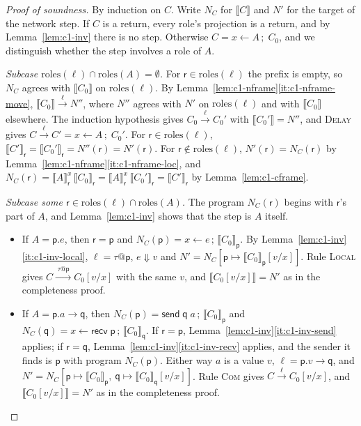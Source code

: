 \documentclass[11pt]{report}
\makeatletter
\theoremstyle{plain}
\theoremstyle{definition}
\theoremstyle{remark}
\newcommand{\kw}[1]{\mathsf{#1}}
\newcommand{\pp}{\mathsf{p}}
\newcommand{\qq}{\mathsf{q}}
\newcommand{\rr}{\mathsf{r}}
\newcommand{\bind}[3]{#1 \leftarrow #2\,;\;#3}
\newcommand{\com}[3]{#1.#2 \to #3}
\newcommand{\roles}[1]{\mathrm{roles}(#1)}
\newcommand{\tauat}[1]{\tau\mathord{@}#1}
\newcommand{\lto}[1]{\xrightarrow{\;#1\;}}
\newcommand{\nsend}[2]{\kw{send}\;#1\;#2}
\newcommand{\nrecv}[1]{\kw{recv}\;#1}
\newcommand{\upd}[3]{#1[#2 \mapsto #3]}
\newcommand{\proj}[2]{\llbracket #1 \rrbracket_{#2}}
\newcommand{\projn}[1]{\llbracket #1 \rrbracket}
\newcommand{\pre}[3]{\llbracket #1 \rrbracket^{#2}_{#3}}
\newcommand{\rn}[1]{{\normalfont\scshape #1}}
\newcommand{\subcase}[1]{\smallskip\noindent\textit{Subcase #1.}\;}
\makeatother
\begin{document}
\begin{proof}[Proof of soundness]
  By induction on $C$.  Write $N_C$ for $\projn{C}$ and $N'$ for the target
  of the network step.  If $C$ is a return, every role's projection is a
  return, and by Lemma~\ref{lem:c1-inv} there is no step.  Otherwise
  $C=\bind{x}{A}{C_0}$, and we distinguish whether the step involves a role
  of $A$.

  \subcase{$\roles{\ell}\cap\roles{A}=\emptyset$}
  For $\rr\in\roles{\ell}$ the prefix is empty, so $N_C$ agrees with
  $\projn{C_0}$ on $\roles{\ell}$.  By
  Lemma~\ref{lem:c1-nframe}\ref{it:c1-nframe-move},
  $\projn{C_0}\lto{\ell}N''$, where $N''$ agrees with $N'$ on $\roles{\ell}$ and
  with $\projn{C_0}$ elsewhere.  The induction hypothesis gives
  $C_0\lto{\ell}C_0'$ with $\projn{C_0'}=N''$, and \rn{Delay} gives
  $C\lto{\ell}C'=\bind{x}{A}{C_0'}$.  For $\rr\in\roles{\ell}$,
  $\proj{C'}{\rr}=\proj{C_0'}{\rr}=N''(\rr)=N'(\rr)$.  For
  $\rr\notin\roles{\ell}$, $N'(\rr)=N_C(\rr)$ by
  Lemma~\ref{lem:c1-nframe}\ref{it:c1-nframe-loc}, and
  $N_C(\rr)=\pre{A}{x}{\rr}\,\proj{C_0}{\rr}=\pre{A}{x}{\rr}\,\proj{C_0'}{\rr}=\proj{C'}{\rr}$
  by Lemma~\ref{lem:c1-cframe}.

  \subcase{some $\rr\in\roles{\ell}\cap\roles{A}$}
  The program $N_C(\rr)$ begins with $\rr$'s part of $A$, and
  Lemma~\ref{lem:c1-inv} shows that the step is $A$ itself.
  \begin{itemize}
  \item If $A=\pp.e$, then $\rr=\pp$ and $N_C(\pp)=x\leftarrow e\,;\,\proj{C_0}{\pp}$.
    By Lemma~\ref{lem:c1-inv}\ref{it:c1-inv-local}, $\ell=\tauat{\pp}$,
    $e\Downarrow v$ and $N'=\upd{N_C}{\pp}{\proj{C_0}{\pp}[v/x]}$.  Rule
    \rn{Local} gives $C\lto{\tauat\pp}C_0[v/x]$ with the same $v$, and
    $\projn{C_0[v/x]}=N'$ as in the completeness proof.
  \item If $A=\com{\pp}{a}{\qq}$, then $N_C(\pp)=\nsend{\qq}{a}\,;\,\proj{C_0}{\pp}$
    and $N_C(\qq)=x\leftarrow\nrecv{\pp}\,;\,\proj{C_0}{\qq}$.  If $\rr=\pp$,
    Lemma~\ref{lem:c1-inv}\ref{it:c1-inv-send} applies; if $\rr=\qq$,
    Lemma~\ref{lem:c1-inv}\ref{it:c1-inv-recv} applies, and the sender it
    finds is $\pp$ with program $N_C(\pp)$.  Either way $a$ is a value $v$,
    $\ell=\com{\pp}{v}{\qq}$, and
    $N'=N_C[\pp\mapsto\proj{C_0}{\pp},\ \qq\mapsto\proj{C_0}{\qq}[v/x]]$.  Rule
    \rn{Com} gives $C\lto{\ell}C_0[v/x]$, and $\projn{C_0[v/x]}=N'$ as in the
    completeness proof.\qedhere
  \end{itemize}
\end{proof}
\end{document}
